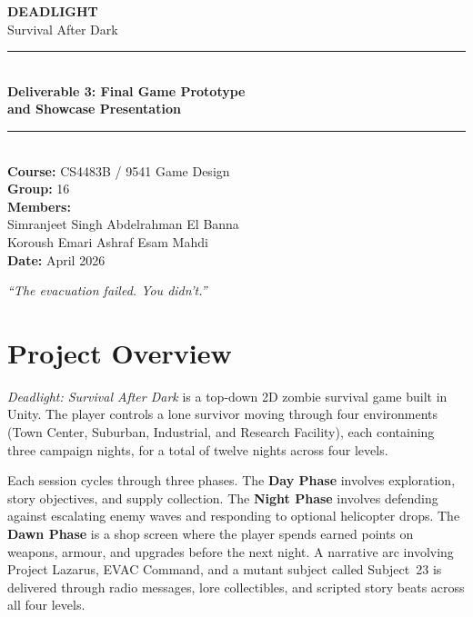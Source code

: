 \documentclass[11pt,a4paper]{article}
\begin{document}
\begin{titlepage}
  \pagecolor{deaddark}
  \color{white}
  \vspace*{3cm}
  \begin{center}
    {\fontsize{38}{46}\selectfont\bfseries\textcolor{deadred}{DEADLIGHT}}\\[0.3cm]
    {\Large\textcolor{deadgold}{Survival After Dark}}\\[1.2cm]
    \textcolor{deadgray}{\rule{0.6\textwidth}{0.6pt}}\\[0.8cm]
    {\large\bfseries Deliverable 3: Final Game Prototype}\\[0.2cm]
    {\large\bfseries and Showcase Presentation}\\[0.6cm]
    \textcolor{deadgray}{\rule{0.6\textwidth}{0.6pt}}\\[1.2cm]
    {\normalsize
      \textbf{Course:} CS4483B / 9541 Game Design\\[0.3cm]
      \textbf{Group:} 16\\[0.3cm]
      \textbf{Members:}\\[0.2cm]
      Simranjeet Singh \quad Abdelrahman El Banna\\
      Koroush Emari \quad Ashraf Esam Mahdi\\[0.6cm]
      \textbf{Date:} April 2026
    }
  \end{center}
  \vfill
  \begin{center}
    \textcolor{deadgold}{\small\textit{``The evacuation failed. You didn't.''}}
  \end{center}
\end{titlepage}
\nopagecolor

\tableofcontents
\newpage

\section{Project Overview}

\textit{Deadlight: Survival After Dark} is a top-down 2D zombie survival game built in Unity. The player controls a lone survivor moving through four environments (Town Center, Suburban, Industrial, and Research Facility), each containing three campaign nights, for a total of twelve nights across four levels.

Each session cycles through three phases. The \textbf{Day Phase} involves exploration, story objectives, and supply collection. The \textbf{Night Phase} involves defending against escalating enemy waves and responding to optional helicopter drops. The \textbf{Dawn Phase} is a shop screen where the player spends earned points on weapons, armour, and upgrades before the next night. A narrative arc involving Project Lazarus, EVAC Command, and a mutant subject called Subject~23 is delivered through radio messages, lore collectibles, and scripted story beats across all four levels.
\end{document}
